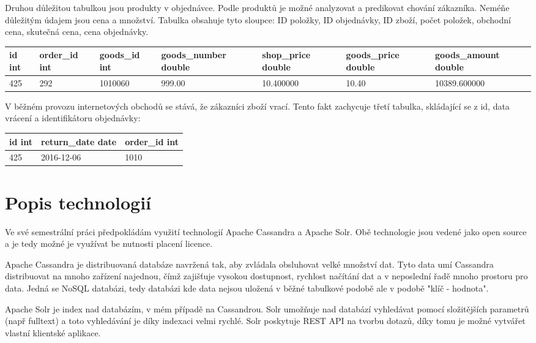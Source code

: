 \documentclass[czech]{article}
\begin{document}
Druhou důležitou tabulkou jsou produkty v objednávce. Podle produktů je možné analyzovat a predikovat chování zákazníka. Neméňe důležitým údajem jsou cena a množství. Tabulka obsahuje tyto sloupce: ID položky, ID objednávky, ID zboží, počet položek, obchodní cena, skutečná cena, cena objednávky.

\begin{table}[h!]
\begin{tabular}{|l|l|l|l|l|l|l|}
\hline
id int & order\_id int & goods\_id int & goods\_number double & shop\_price double & goods\_price double & goods\_amount double \\ \hline
425    & 292           & 1010060       & 999.00               & 10.400000          & 10.40               & 10389.600000         \\ \hline
\end{tabular}
\end{table}

V běžném provozu internetových obchodů se stává, že zákazníci zboží vrací. Tento fakt zachycuje třetí tabulka, skládající se z id, data vrácení a identifikátoru objednávky:

\begin{table}[h!]
\begin{tabular}{|l|l|l|}
\hline
id int & return\_date date & order\_id int \\ \hline
425    & 2016-12-06          & 1010 \\ \hline
\end{tabular}
\end{table}

\section{Popis technologií}

Ve své semestrální práci předpokládám využití technologií Apache Cassandra a Apache Solr. Obě technologie jsou vedené jako open source a je tedy možné je využívat be nutnosti placení licence.

Apache Cassandra je distribuovaná databáze navržená tak, aby zvládala obsluhovat velké množství dat. Tyto data umí Cassandra distribuovat na mnoho zařízení najednou, čímž zajišťuje vysokou dostupnost, rychlost načítání dat a v neposlední řadě mnoho prostoru pro data. Jedná se NoSQL databázi, tedy databázi kde data nejsou uložená v běžné tabulkové podobě ale v podobě "klíč - hodnota".

Apache Solr je index nad databázím, v mém případě na Cassandrou. Solr umožňuje nad databází vyhledávat pomocí složitějších parametrů (např fulltext) a toto vyhledávání je díky indexaci velmi rychlé. Solr poskytuje REST API na tvorbu dotazů, díky tomu je možné vytvářet vlastní klientské aplikace.
\end{document}
